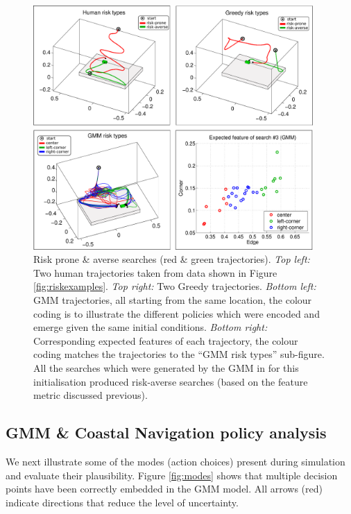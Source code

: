\begin{figure}[h!]
 \centering
  \includegraphics[width=0.95\textwidth]{./ch3-Search/Figures/Figure8}
  \caption{Risk prone \& averse searches (red \& green trajectories). \textit{Top left:}
  Two human trajectories taken from data shown in Figure \ref{fig:riskexamples}. 
  \textit{Top right:} Two Greedy trajectories. \textit{Bottom left:} GMM trajectories, all starting from the same location, the
  colour coding is to illustrate the different policies which were encoded and emerge given the same initial conditions. 
  \textit{Bottom right:} Corresponding expected features of each trajectory, the colour coding matches the trajectories 
  to the ``GMM risk types'' sub-figure. All the searches which were generated by the GMM in for this initialisation produced
  risk-averse searches (based on the feature metric discussed previous).}
  \label{fig:risk_examples}
\end{figure}


\subsection{GMM \& Coastal Navigation policy analysis}

We next illustrate some of the modes (action choices) present during simulation and evaluate their 
plausibility. Figure \ref{fig:modes} shows that multiple decision points have been correctly embedded in the GMM model. All
arrows (red) indicate directions that reduce the level of uncertainty. 

